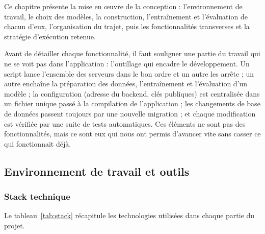 
Ce chapitre présente la mise en œuvre de la conception : l'environnement de travail, le
choix des modèles, la construction, l'entraînement et l'évaluation de chacun d'eux,
l'organisation du trajet, puis les fonctionnalités transverses et la stratégie
d'exécution retenue.

Avant de détailler chaque fonctionnalité, il faut souligner une partie du travail qui ne se
voit pas dans l'application : l'outillage qui encadre le développement. Un script lance
l'ensemble des serveurs dans le bon ordre et un autre les arrête ; un autre enchaîne la
préparation des données, l'entraînement et l'évaluation d'un modèle ; la configuration
(adresse du backend, clés publiques) est centralisée dans un fichier unique passé à la
compilation de l'application ; les changements de base de données passent toujours par une
nouvelle migration ; et chaque modification est vérifiée par une suite de tests
automatiques. Ces éléments ne sont pas des fonctionnalités, mais ce sont eux qui nous ont
permis d'avancer vite sans casser ce qui fonctionnait déjà.

\subsection{Environnement de travail et outils}

\subsubsection{Stack technique}

Le tableau~\ref{tab:stack} récapitule les technologies utilisées dans chaque partie du
projet.

